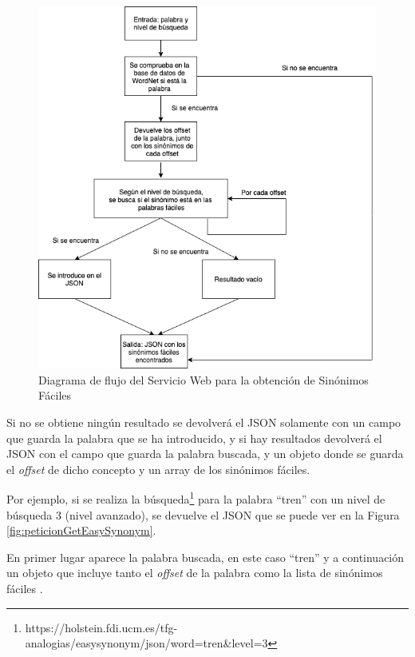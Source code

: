 \begin{figure}[!h]
	\includegraphics[width=.9\textwidth]{Imagenes/Bitmap/Capitulo4/ServiciosWeb/DiagramaFlujoSinonimos.png}
	\centering
	\caption{Diagrama de flujo del Servicio Web para la obtención de Sinónimos Fáciles}
	\label{fig:swsinonimos}
\end{figure}
 Si no se obtiene ningún resultado se devolverá el JSON solamente con un campo que guarda la palabra que se ha introducido, y si hay resultados devolverá el JSON con el campo que guarda la palabra buscada, y un objeto donde se guarda el \textit{offset} de dicho concepto y un array de los sinónimos fáciles.

Por ejemplo, si se realiza la búsqueda\footnote{https://holstein.fdi.ucm.es/tfg-analogias/easysynonym/json/word=tren\&level=3} para la palabra ``tren'' con un nivel de búsqueda 3 (nivel avanzado), se devuelve el JSON que se puede ver en la Figura \ref{fig:peticionGetEasySynonym}.

En primer lugar aparece la palabra buscada, en este caso ``tren'' y a continuación un objeto que incluye tanto el \textit{offset} de la palabra como la lista de sinónimos fáciles .

